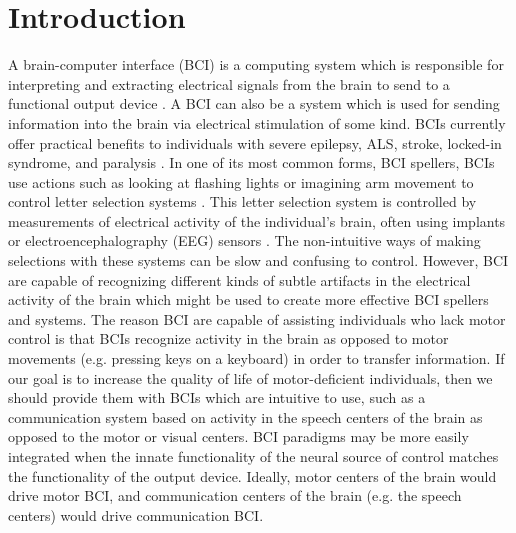 \documentclass{article}
\begin{document}
\section{Introduction}
A brain-computer interface (BCI) is a computing system which is responsible for interpreting and extracting electrical signals from the brain to send to a functional output device \citep{Shih2012}. A BCI can also be a system which is used for sending information into the brain via electrical stimulation of some kind. BCIs currently offer practical benefits to individuals with severe epilepsy, ALS, stroke, locked-in syndrome, and paralysis \citep{Morrell1295, 6775293}. In one of its most common forms, BCI spellers, BCIs use actions such as looking at flashing lights or imagining arm movement to control letter selection systems  \citep{GUY20185, Sellers257re7}. This letter selection system is controlled by measurements of electrical activity of the individual's brain, often using implants or electroencephalography (EEG) sensors \citep{6775293, Rezeika2018}. The non-intuitive ways of making selections with these systems can be slow and confusing to control. However, BCI are capable of recognizing different kinds of subtle artifacts in the electrical activity of the brain which might be used to create more effective BCI spellers and systems. The reason BCI are capable of assisting individuals who lack motor control is that BCIs recognize activity in the brain as opposed to motor movements (e.g. pressing keys on a keyboard) in order to transfer information. If our goal is to increase the quality of life of motor-deficient individuals, then we should provide them with BCIs which are intuitive to use, such as a communication system based on activity in the speech centers of the brain as opposed to the motor or visual centers. BCI paradigms may be more easily integrated when the innate functionality of the neural source of control matches the functionality of the output device. Ideally, motor centers of the brain would drive motor BCI, and communication centers of the brain (e.g. the speech centers) would drive communication BCI. 
\end{document}
